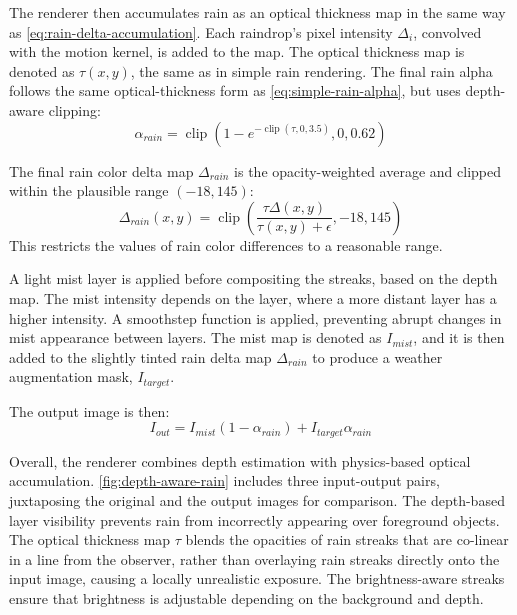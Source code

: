 \documentclass[10pt,letterpaper]{article}
\begin{document}
The renderer then accumulates rain as an optical thickness map in the same way as \autoref{eq:rain-delta-accumulation}. Each raindrop's pixel intensity $\Delta_i$, convolved with the motion kernel, is added to the map. The optical thickness map is denoted as $\tau(x,y)$, the same as in simple rain rendering. 
The final rain alpha follows the same optical-thickness form as \autoref{eq:simple-rain-alpha}, but uses depth-aware clipping:
\[
\alpha_{rain} = \operatorname{clip}(1-e^{-\operatorname{clip}(\tau,0,3.5)},0,0.62)
\]

The final rain color delta map $\Delta_{rain}$ is the opacity-weighted average and clipped within the plausible range $(-18, 145)$:
\[
\Delta_{rain}(x,y)=\operatorname{clip}\left(\frac{\tau\Delta(x,y)}{\tau(x,y)+\epsilon}, -18, 145\right)
\]
This restricts the values of rain color differences to a reasonable range.

A light mist layer is applied before compositing the streaks, based on the depth map. The mist intensity depends on the layer, where a more distant layer has a higher intensity.
A smoothstep function is applied, preventing abrupt changes in mist appearance between layers. 
The mist map is denoted as $I_{mist}$, and it is then added to the slightly tinted 
rain delta map $\Delta_{rain}$ to produce a weather augmentation mask, $I_{target}$.

The output image is then:
\[
I_{out} = I_{mist}(1-\alpha_{rain})+I_{target} \alpha_{rain}
\]

Overall, the renderer combines depth estimation with physics-based optical accumulation. \autoref{fig:depth-aware-rain} includes three input-output pairs, juxtaposing the original and the output images for comparison. 
The depth-based layer visibility prevents rain from incorrectly appearing over foreground objects.
The optical thickness map $\tau$ blends the opacities of rain streaks that are co-linear in a line from the observer, 
rather than overlaying rain streaks directly onto the input image, causing a locally unrealistic exposure. The brightness-aware streaks ensure that brightness is adjustable 
depending on the background and depth. 
\end{document}
